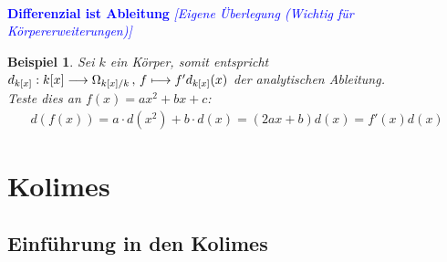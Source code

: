 \documentclass[10pt,a4paper]{report}
\newcommand{\comment}[1]{}
\newcounter{Aussage}[chapter]
\newtheorem{bsp}[Aussage]{Beispiel}
\newcommand{\function}[5]{\nolinebreak{#1:#2 \longrightarrow #3 \, , \, #4 \longmapsto #5}}
\newcommand{\divR}[2]{\Omega_{#1/#2}}
\newcommand{\divf}[1]{d_{#1}}
\begin{document}
\ \\
\textcolor{blue}{\textbf{Differenzial ist Ableitung} \textit{[Eigene Überlegung (Wichtig für Körpererweiterungen)]}}
\begin{bsp}\label{Differenzial ist Ableitung}
Sei $k$ ein Körper, somit entspricht $\function{\divf{k[x]}}{k[x]}{\divR{k[x]}{k}}{f}{f'\divf{k[x]}(x)}$ der analytischen Ableitung.\\
Teste dies an $f(x)=ax^2 + bx +c$:
\begin{gather*}
d(f(x)) = a \cdot d(x^2) + b \cdot d(x) = (2ax + b) d(x) = f'(x) d(x) 
\end{gather*}
\comment{lässt sich induktiv für Monome leicht zeigen}
\end{bsp}


\chapter{Kolimes}
\section{Einführung in den Kolimes}
\end{document}
